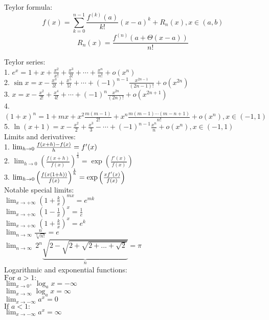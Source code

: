 \documentclass{letter}
\begin{document}
Teylor formula:
$$
f(x) = \sum_{k = 0}^{n - 1} \frac{f^{(k)} (a)}{k!} (x - a)^k + R_n(x), x \in (a, b)
$$
$$
R_n(x) = \frac{f^{(n)}(a + \Theta(x - a))}{n!} 
$$

Teylor series: \\
1. $e^x = 1 + x + \frac{x^2}{x!} + \frac{x^3}{3!} + \cdots + \frac{x^n}{n!} + o(x^n) $ \\
2. $ \sin{x} = x - \frac{x^3}{3!} + \frac{x^5}{5!} + \cdots + (-1)^{n-1}\frac{x^{2n-1}}{(2n-1)!} + o(x^{2n}) $ \\
3. $ x = x - \frac{x^2}{2!} + \frac{x^4}{4!} + \cdots + (-1)^n\frac{x^{2n}}{(2n)!} + o(x^{2n+1}) $ \\
4. $ (1+x)^n = 1 + mx + x^2\frac{m(m-1)}{2!} + x^n\frac{m(m-1)\cdots(m-n+1)}{n!} + o(x^n), x \in (-1,1) $ \\
5. $ \ln(x + 1) = x - \frac{x^2}{2} + \frac{x^3}{3} - \cdots + (-1)^{n-1}\frac{x^n}{n} + o(x^n), x \in (-1,1) $ \\

Limits and derivatives: \\

1. $\lim_{h\to 0}{f(x+h)-f(x)\over h}=f'(x)$ \\
2. $\lim_{h\to0}\left(\frac{f(x+h)}{f(x)}\right)^\frac{1}{h}=\exp\left(\frac{f'(x)}{f(x)}\right)$ \\
3. $\lim_{h \to 0}{ \left({f(x(1+h))\over{f(x)}}\right)^{1\over{h}} }=\exp\left(\frac{x f'(x)}{f(x)}\right)$ \\

Notable special limits: \\

$\lim_{x\to+\infty} \left(1+\frac{k}{x}\right)^{mx}=e^{mk} $ \\
$\lim_{x\to+\infty} \left(1-\frac{1}{x}\right)^x=\frac{1}{e} $ \\
$\lim_{x\to+\infty} \left(1+\frac{k}{x}\right)^x=e^k $ \\
$\lim_{n\to\infty} \frac{n}{\sqrt[n]{n!}}=e $ \\
$\lim_{n\to \infty }\, 2^{n} \underbrace{\sqrt{2-\sqrt{2+\sqrt{2+\text{...} +\sqrt{2}}}}}_n= \pi $ \\

Logarithmic and exponential functions: \\
$\mbox{For } a > 1: \, $ \\
$\lim_{x \to 0^+} \log_a x = -\infty$ \\
$\lim_{x \to \infty} \log_a x = \infty$ \\
$\lim_{x \to -\infty} a^x = 0 $ \\
$\mbox{If } a < 1: \, $ \\
$\lim_{x \to -\infty} a^x = \infty $ \\
\end{document}
